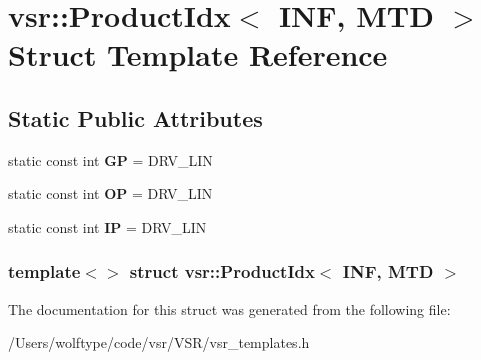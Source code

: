 \hypertarget{structvsr_1_1_product_idx_3_01_i_n_f_00_01_m_t_d_01_4}{\section{vsr\-:\-:Product\-Idx$<$ I\-N\-F, M\-T\-D $>$ Struct Template Reference}
\label{structvsr_1_1_product_idx_3_01_i_n_f_00_01_m_t_d_01_4}
}
\subsection*{Static Public Attributes}
\begin{DoxyCompactItemize}
\item 
\hypertarget{structvsr_1_1_product_idx_3_01_i_n_f_00_01_m_t_d_01_4_a0ef79d7a4bd4337e597f77a619abf601}{static const int {\bfseries G\-P} = D\-R\-V\-\_\-\-L\-I\-N}\label{structvsr_1_1_product_idx_3_01_i_n_f_00_01_m_t_d_01_4_a0ef79d7a4bd4337e597f77a619abf601}

\item 
\hypertarget{structvsr_1_1_product_idx_3_01_i_n_f_00_01_m_t_d_01_4_a59c80088d498e8a635244508430cf746}{static const int {\bfseries O\-P} = D\-R\-V\-\_\-\-L\-I\-N}\label{structvsr_1_1_product_idx_3_01_i_n_f_00_01_m_t_d_01_4_a59c80088d498e8a635244508430cf746}

\item 
\hypertarget{structvsr_1_1_product_idx_3_01_i_n_f_00_01_m_t_d_01_4_a25f8694c5004295a817ab7a298ff7366}{static const int {\bfseries I\-P} = D\-R\-V\-\_\-\-L\-I\-N}\label{structvsr_1_1_product_idx_3_01_i_n_f_00_01_m_t_d_01_4_a25f8694c5004295a817ab7a298ff7366}

\end{DoxyCompactItemize}
\subsubsection*{template$<$$>$ struct vsr\-::\-Product\-Idx$<$ I\-N\-F, M\-T\-D $>$}



The documentation for this struct was generated from the following file\-:\begin{DoxyCompactItemize}
\item 
/\-Users/wolftype/code/vsr/\-V\-S\-R/vsr\-\_\-templates.\-h\end{DoxyCompactItemize}

